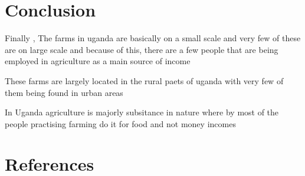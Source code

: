 \documentclass{article}
\begin{document}
\section{Conclusion}
Finally , The farms in uganda are basically on a small scale and very few of these are on large scale and because of this, there are a few people that are being employed in agriculture as a main source of income

These farms are largely located in the rural paets of uganda with very few of them being found in urban areas

In Uganda agriculture is majorly subsitance in nature where by most of the people practising farming do it for food and not money incomes

\section{References}
\end{document}
